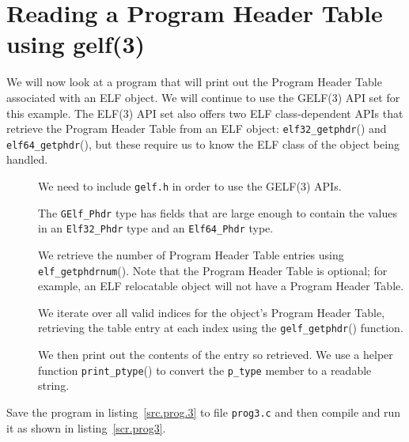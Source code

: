 \documentclass[a4paper]{book}
\makeatletter
\newcommand{\function}[1]{\texttt{#1}()}
\newcommand{\filename}[1]{\texttt{#1}}
\newcommand{\parameter}[1]{\texttt{#1}}
\newcommand{\type}[1]{\texttt{#1}}
\newenvironment{callout}[2][blue]{%
  \begingroup\newcommand{\@cocolor}{#1}%
  \newcommand{\@cogroup}[1]{#2}}{\endgroup}
\newcommand{\@co}[1]{\framebox{\textbf{\color{\@cocolor}#1}}}
\newcommand{\coref}[1]{%
  \hypertarget{\@cogroup.#1.cr}{%
    \hyperlink{\@cogroup.#1.co}{\@co{#1}}}}
\makeatother
\begin{document}
\section{Reading a Program Header Table using gelf(3)}
We will now look at a program that will print out the Program Header
Table associated with an ELF object.  We will continue to use the
GELF(3) API set for this example.  The ELF(3) API set also offers two
ELF class-dependent APIs that retrieve the Program Header Table from
an ELF object: \function{elf32\_getphdr} and
\function{elf64\_getphdr}, but these require us to know the ELF class
of the object being handled.

\begin{callout}{prog3}
  
  
  \begin{description}
  \item[\coref{1}] We need to include \filename{gelf.h} in order to
    use the GELF(3) APIs.
  \item[\coref{2}] The \type{GElf\_Phdr} type has fields that are
    large enough to contain the values in an \type{Elf32\_Phdr} type
    and an \type{Elf64\_Phdr} type.
  \item[\coref{3}] We retrieve the number of Program Header Table
    entries using \function{elf\_getphdrnum}.  Note that the Program
    Header Table is optional; for example, an ELF relocatable object
    will not have a Program Header Table.
  \item[\coref{4} \coref{5}] We iterate over all valid indices for the
    object's Program Header Table, retrieving the table entry at each
    index using the \function{gelf\_getphdr} function.
  \item[\coref{6} \coref{7}] We then print out the contents of the
    entry so retrieved.  We use a helper function
    \function{print\_ptype} to convert the \parameter{p\_type} member
    to a readable string.
  \end{description}
\end{callout}

Save the program in listing~\vref{src.prog.3} to file \filename{prog3.c} and
then compile and run it as shown in listing~\vref{scr.prog3}.
\end{document}

